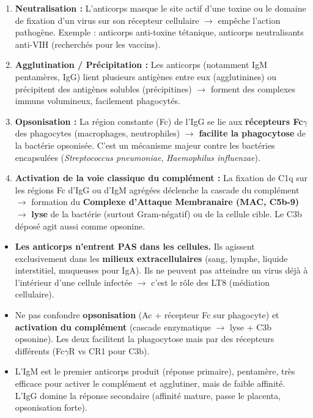 \documentclass[11pt]{article}
\begin{document}
\begin{propriete}
\begin{enumerate}
    \item \textbf{Neutralisation :} L'anticorps masque le site actif d'une toxine ou le domaine de fixation d'un virus sur son récepteur cellulaire $\to$ empêche l'action pathogène. Exemple : anticorps anti-toxine tétanique, anticorps neutralisants anti-VIH (recherchés pour les vaccins).
    \item \textbf{Agglutination / Précipitation :} Les anticorps (notamment IgM pentamères, IgG) lient plusieurs antigènes entre eux (agglutinines) ou précipitent des antigènes solubles (précipitines) $\to$ forment des complexes immuns volumineux, facilement phagocytés.
    \item \textbf{Opsonisation :} La région constante (Fc) de l'IgG se lie aux \textbf{récepteurs Fc$\gamma$} des phagocytes (macrophages, neutrophiles) $\to$ \textbf{facilite la phagocytose} de la bactérie opsonisée. C'est un mécanisme majeur contre les bactéries encapsulées (\emph{Streptococcus pneumoniae}, \emph{Haemophilus influenzae}).
    \item \textbf{Activation de la voie classique du complément :} La fixation de C1q sur les régions Fc d'IgG ou d'IgM agrégées déclenche la cascade du complément $\to$ formation du \textbf{Complexe d'Attaque Membranaire (MAC, C5b-9)} $\to$ \textbf{lyse} de la bactérie (surtout Gram-négatif) ou de la cellule cible. Le C3b déposé agit aussi comme opsonine.
\end{enumerate}
\end{propriete}

\begin{attention}
\begin{itemize}
    \item \textbf{Les anticorps n'entrent PAS dans les cellules.} Ils agissent exclusivement dans les \textbf{milieux extracellulaires} (sang, lymphe, liquide interstitiel, muqueuses pour IgA). Ils ne peuvent pas atteindre un virus déjà à l'intérieur d'une cellule infectée $\to$ c'est le rôle des LT8 (médiation cellulaire).
    \item Ne pas confondre \textbf{opsonisation} (Ac + récepteur Fc sur phagocyte) et \textbf{activation du complément} (cascade enzymatique $\to$ lyse + C3b opsonine). Les deux facilitent la phagocytose mais par des récepteurs différents (Fc$\gamma$R vs CR1 pour C3b).
    \item L'IgM est le premier anticorps produit (réponse primaire), pentamère, très efficace pour activer le complément et agglutiner, mais de faible affinité. L'IgG domine la réponse secondaire (affinité mature, passe le placenta, opsonisation forte).
\end{itemize}
\end{attention}
\end{document}
